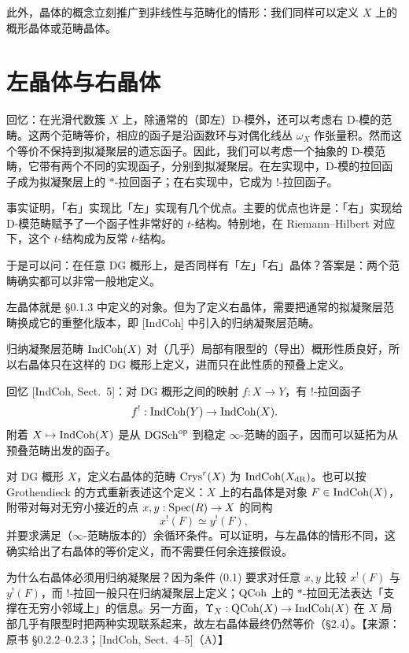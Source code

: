 此外，晶体的概念立刻推广到非线性与范畴化的情形：我们同样可以定义 $X$ 上的概形晶体或范畴晶体。

\section{左晶体与右晶体}

回忆：在光滑代数簇 $X$ 上，除通常的（即左）D-模外，还可以考虑右 D-模的范畴。这两个范畴等价，相应的函子是沿函数环与对偶化线丛 $\omega_X$ 作张量积。然而这个等价不保持到拟凝聚层的遗忘函子。因此，我们可以考虑一个抽象的 D-模范畴，它带有两个不同的实现函子，分别到拟凝聚层。在左实现中，D-模的拉回函子成为拟凝聚层上的 $*$-拉回函子；在右实现中，它成为 $!$-拉回函子。

事实证明，「右」实现比「左」实现有几个优点。主要的优点也许是：「右」实现给 D-模范畴赋予了一个函子性非常好的 $t$-结构。特别地，在 Riemann--Hilbert 对应下，这个 $t$-结构成为反常 $t$-结构。

于是可以问：在任意 DG 概形上，是否同样有「左」「右」晶体？答案是：两个范畴确实都可以非常一般地定义。

左晶体就是 §0.1.3 中定义的对象。但为了定义右晶体，需要把通常的拟凝聚层范畴换成它的重整化版本，即 [IndCoh] 中引入的归纳凝聚层范畴。

归纳凝聚层范畴 $\mathrm{IndCoh}(X)$ 对（几乎）局部有限型的（导出）概形性质良好，所以右晶体只在这样的 DG 概形上定义，进而只在此性质的预叠上定义。

回忆 [IndCoh, Sect.~5]：对 DG 概形之间的映射 $f:X\to Y$，有 $!$-拉回函子
\[
f^!:\mathrm{IndCoh}(Y)\to\mathrm{IndCoh}(X).
\]
附着 $X\mapsto\mathrm{IndCoh}(X)$ 是从 $\mathrm{DGSch}^{\mathrm{op}}$ 到稳定 $\infty$-范畴的函子，因而可以延拓为从预叠范畴出发的函子。

对 DG 概形 $X$，定义右晶体的范畴 $\mathrm{Crys}^r(X)$ 为 $\mathrm{IndCoh}(X_{\mathrm{dR}})$。也可以按 Grothendieck 的方式重新表述这个定义：$X$ 上的右晶体是对象 $F\in\mathrm{IndCoh}(X)$，附带对每对无穷小接近的点 $x,y:\mathrm{Spec}(R)\to X$ 的同构
\begin{equation}
x^!(F)\simeq y^!(F),\tag{0.1}
\end{equation}
并要求满足（$\infty$-范畴版本的）余循环条件。可以证明，与左晶体的情形不同，这确实给出了右晶体的等价定义，而不需要任何余连接假设。

\begin{annote}
为什么右晶体必须用归纳凝聚层？因为条件 (0.1) 要求对任意 $x,y$ 比较 $x^!(F)$ 与 $y^!(F)$，而 $!$-拉回一般只在归纳凝聚层上定义；$\mathrm{QCoh}$ 上的 $*$-拉回无法表达「支撑在无穷小邻域上」的信息。另一方面，$\Upsilon_X:\mathrm{QCoh}(X)\to\mathrm{IndCoh}(X)$ 在 $X$ 局部几乎有限型时把两种实现联系起来，故左右晶体最终仍然等价（§2.4）。\hfill【来源：原书 §0.2.2--0.2.3；[IndCoh, Sect.~4--5]（A）】
\end{annote}


